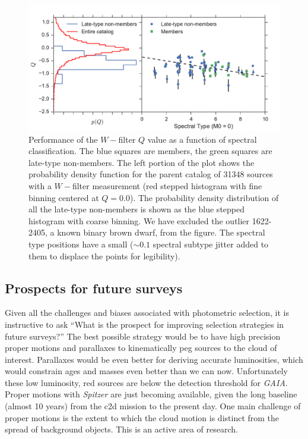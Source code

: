 \begin{figure}[ht!]
  \caption{ Performance of the $W-$filter $Q$ value as a function of spectral classification.  The blue squares are members, the green squares are late-type non-members.  The left portion of the plot shows the probability density function for the parent catalog of 31348 sources with a $W-$filter measurement (red stepped histogram with fine binning centered at $Q=0.0$).  The probability density distribution of all the late-type non-members is shown as the blue stepped histogram with coarse binning. We have excluded the outlier 1622-2405, a known binary brown dwarf, from the figure.  The spectral type positions have a small ($\sim0.1$ spectral subtype jitter added to them to displace the points for legibility).\label{fig_W_results} }
\centering
\includegraphics[scale=0.6]{chIMACS/figures/W_filter_results}
\end{figure}

\subsection{Prospects for future surveys}
Given all the challenges and biases associated with photometric selection, it is instructive to ask ``What is the prospect for improving selection strategies in future surveys?''  The best possible strategy would be to have high precision proper motions and parallaxes to kinematically peg sources to the cloud of interest.  Parallaxes would be even better for deriving accurate luminosities, which would constrain ages and masses even better than we can now.  Unfortunately these low luminosity, red sources are below the detection threshold for \emph{GAIA}.  Proper motions with \emph{Spitzer} are just becoming available, given the long baseline (almost 10 years) from the c2d mission to the present day.  One main challenge of proper motions is the extent to which the cloud motion is distinct from the spread of background objects.  This is an active area of research.

